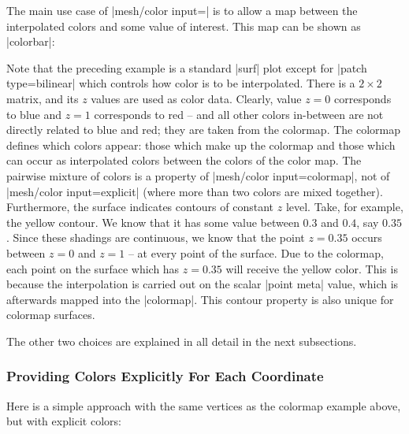 {{The main use case of |mesh/color input=| is to allow a
map between the interpolated colors and some value of interest. This map can be
shown as |colorbar|:
%
\begin{codeexample}[]
\end{codeexample}
%
\noindent Note that the preceding example is a standard |surf| plot except for
|patch type=bilinear| which controls how color is to be interpolated. There is
a $2 \times 2$ matrix, and its $z$ values are used as color data. Clearly,
value $z=0$ corresponds to blue and $z=1$ corresponds to red -- and all other
colors in-between are not directly related to blue and red; they are taken from
the colormap. The colormap defines which colors appear: those which make up the
colormap and those which can occur as interpolated colors between the colors of
the color map. The pairwise mixture of colors is a property of
|mesh/color input=colormap|, not of |mesh/color input=explicit| (where more
than two colors are mixed together). Furthermore, the surface indicates
contours of constant $z$ level. Take, for example, the yellow contour. We know
that it has some value between $0.3$ and $0.4$, say $0.35$. Since these
shadings are continuous, we know that the point $z=0.35$ occurs between $z=0$
and $z=1$ -- at every point of the surface. Due to the colormap, each point on
the surface which has $z=0.35$ will receive the yellow color. This is because
the interpolation is carried out on the scalar |point meta| value, which is
afterwards mapped into the |colormap|. This contour property is also unique for
colormap surfaces.

The other two choices are explained in all detail in the next subsections.


\subsubsection{Providing Colors Explicitly For Each Coordinate}
\label{sec:surf:explicit:color}

Here is a simple approach with the same vertices as the colormap example above,
but with explicit colors:
%
\begin{codeexample}[]
\end{codeexample}}}

